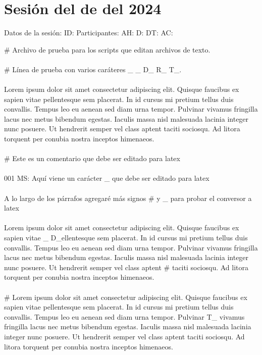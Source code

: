 \section{Sesión del de del 2024}
\noindent
Datos de la sesión:
ID:
Participantes:
AH:
D:
DT:
AC:

\noindent
\# Archivo de prueba para los scripts que editan archivos de texto.\\
\\
\# Línea de prueba con varios caráteres \_ \_ D\_ R\_ T\_.\\
\\
Lorem ipsum dolor sit amet consectetur adipiscing elit. Quisque faucibus ex sapien vitae pellentesque sem placerat. In id cursus mi pretium tellus duis convallis. Tempus leo eu aenean sed diam urna tempor. Pulvinar vivamus fringilla lacus nec metus bibendum egestas. Iaculis massa nisl malesuada lacinia integer nunc posuere. Ut hendrerit semper vel class aptent taciti sociosqu. Ad litora torquent per conubia nostra inceptos himenaeos.\\
\\
\# Este es un comentario que debe ser editado para latex\\
\\
001 MS: Aquí viene un carácter \_ que debe ser editado para latex\\
\\
A lo largo de los párrafos agregaré más signos \# y \_ para probar el conversor a latex\\
\\
Lorem ipsum dolor sit amet consectetur adipiscing elit. Quisque faucibus ex sapien vitae \_ D\_ellentesque sem placerat. In id cursus mi pretium tellus duis convallis. Tempus leo eu aenean sed diam urna tempor. Pulvinar vivamus fringilla lacus nec metus bibendum egestas. Iaculis massa nisl malesuada lacinia integer nunc posuere. Ut hendrerit semper vel class aptent \# taciti sociosqu. Ad litora torquent per conubia nostra inceptos himenaeos.\\
\\
\# Lorem ipsum dolor sit amet consectetur adipiscing elit. Quisque faucibus ex sapien vitae pellentesque sem placerat. In id cursus mi pretium tellus duis convallis. Tempus leo eu aenean sed diam urna tempor. Pulvinar T\_ vivamus fringilla lacus nec metus bibendum egestas. Iaculis massa nisl malesuada lacinia integer nunc posuere. Ut hendrerit semper vel class aptent taciti sociosqu. Ad litora torquent per conubia nostra inceptos himenaeos.\\
